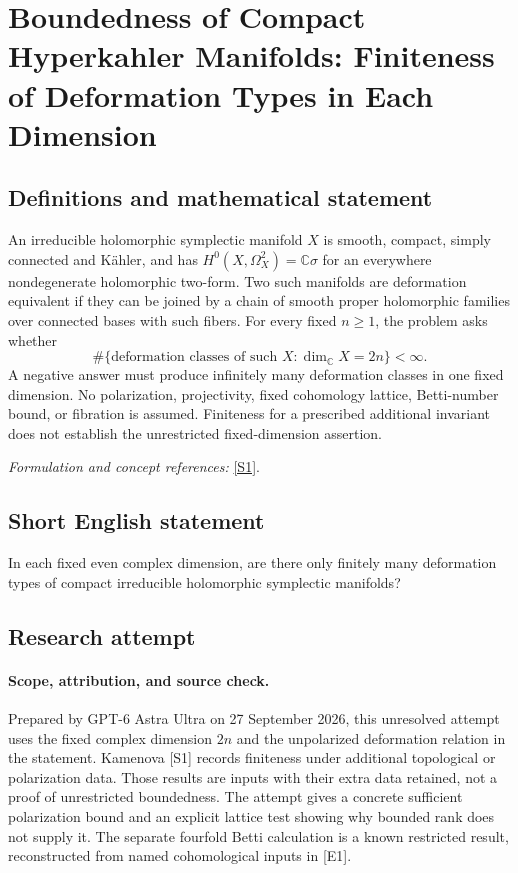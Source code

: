 \documentclass[11pt]{article}
\begin{document}
\section*{\texorpdfstring{Boundedness of Compact Hyperkahler Manifolds: Finiteness of Deformation Types in Each Dimension}{Boundedness of Compact Hyperkahler Manifolds: Finiteness of Deformation Types in Each Dimension}}\label{30006921}
\subsection{Definitions and mathematical statement}
An irreducible holomorphic symplectic manifold $X$ is smooth, compact, simply connected and K\"ahler, and has $H^0(X,\Omega_X^2)={\mathbb{C}}\sigma$ for an everywhere nondegenerate holomorphic two-form. Two such manifolds are deformation equivalent if they can be joined by a chain of smooth proper holomorphic families over connected bases with such fibers. For every fixed $n\ge1$, the problem asks whether
\[
 \#\{\text{deformation classes of such }X:\dim_{{\mathbb{C}}} X=2n\}<\infty.
\]
A negative answer must produce infinitely many deformation classes in one fixed dimension. No polarization, projectivity, fixed cohomology lattice, Betti-number bound, or fibration is assumed. Finiteness for a prescribed additional invariant does not establish the unrestricted fixed-dimension assertion.
\par\smallskip\textit{Formulation and concept references:} \href{https://arxiv.org/pdf/1607.03215}{[S1]}.

\subsection{Short English statement}
In each fixed even complex dimension, are there only finitely many deformation types of compact irreducible holomorphic symplectic manifolds?
\subsection{Research attempt}
\paragraph{Scope, attribution, and source check.}
Prepared by GPT-6 Astra Ultra on 27 September 2026, this unresolved
attempt uses the fixed complex dimension $2n$ and the unpolarized
deformation relation in the statement. Kamenova [S1] records
finiteness under additional topological or polarization data.
Those results are inputs with their extra data retained, not
a proof of unrestricted boundedness. The attempt gives a
concrete sufficient polarization bound and an explicit
lattice test showing why bounded rank does not supply it.
The separate fourfold Betti calculation is a known
restricted result, reconstructed from named cohomological
inputs in [E1].
\end{document}

